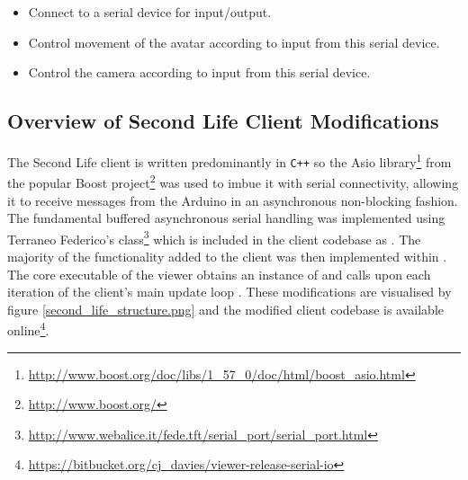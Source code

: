 \begin{itemize}
	\item Connect to a serial device for input/output.
	\item Control movement of the avatar according to input from this serial device.
	\item Control the camera according to input from this serial device.
\end{itemize}


\subsection{Overview of Second Life Client Modifications}

\newcommand{\asioFootnote}{\footnote{\url{http://www.boost.org/doc/libs/1_57_0/doc/html/boost_asio.html}}}

\newcommand{\boostFootnote}{\footnote{\url{http://www.boost.org/}}}

\newcommand{\fedetftFootnote}{\footnote{\url{http://www.webalice.it/fede.tft/serial_port/serial_port.html}}}

\newcommand{\regionmodulelimitationFootnote}{\footnote{This is not due to any limitation on the part of OpenSim, but simply due to the Second Life client modifications being pursued further than the OpenSim region module.}}

\newcommand{\megaregionFootnote}{\footnote{\url{http://opensimulator.org/wiki/Setting_Up_Mega-Regions}}}



The Second Life client is written predominantly in \texttt{C++} so the Asio library\asioFootnote{} from the popular Boost project\boostFootnote{} was used to imbue it with serial connectivity, allowing it to receive messages from the Arduino in an asynchronous non-blocking fashion. The fundamental buffered asynchronous serial handling was implemented using Terraneo Federico's  class\fedetftFootnote{} which is included in the client codebase as . The majority of the functionality added to the client was then implemented within . The core executable of the viewer  obtains an instance of  and calls  upon each iteration of the client's main update loop . These modifications are visualised by figure \ref{second_life_structure.png} and the modified client codebase is available online\footnote{\url{https://bitbucket.org/cj_davies/viewer-release-serial-io}}.

